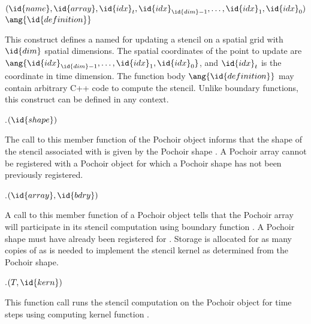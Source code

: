 \begin{closeitemize}
\lstset{language=Pochoir_bf}
\item {}$(\id{name}, \id{array}, \linebreak[0]\id{idx}_t, \linebreak[0]\id{idx}_{\id{dim} - 1},\linebreak[0] \ldots,\linebreak[0] \id{idx}_1, \id{idx}_0)$ \\
     \hspace*{1em} $\ang{\id{definition}}$\\
\end{closeitemize}
This construct defines a  named  for
updating a stencil on a spatial grid with $\id{dim}$ spatial
dimensions. The spatial coordinates of the point to update are
$\ang{\id{idx}_{\id{dim} - 1}, \ldots, \id{idx}_1, \id{idx}_0}$, and
$\id{idx}_t$ is the coordinate in time dimension. The function body
$\ang{\id{definition}}$ may contain arbitrary {C++} code to compute
the stencil.  Unlike boundary functions, this construct can be defined
in any context.

\begin{closeitemize}
\lstset{language=Pochoir_bf}
\item {}.$(\id{shape})$
\end{closeitemize}
The call to this member function of the Pochoir object 
informs  that the shape of the stencil associated with
 is given by the Pochoir shape .  A Pochoir array
cannot be registered with a Pochoir object for which a Pochoir shape
has not been previously registered.

\begin{closeitemize}
\lstset{language=Pochoir_bf}
\item {}.$(\id{array}, \id{bdry})$
\end{closeitemize}
A call to this member function of a Pochoir object  tells
 that the Pochoir array  will participate in its
stencil computation using boundary function .  A Pochoir
shape must have already been registered for .  Storage is
allocated for as many copies of  as is needed to implement
the stencil kernel as determined from the Pochoir shape.

\begin{closeitemize}
\lstset{language=Pochoir_bf}
\item {}.$(T, \id{kern})$
\end{closeitemize} 
This function call runs the stencil computation on the Pochoir object
 for  time steps using computing kernel function
.

